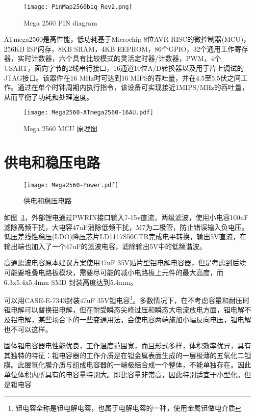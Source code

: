 \begin{figure}[htbp]
    \centering
    \texttt{[image: PinMap2560big\_Rev2.png]}
    \caption{Mega 2560 PIN diagram}
    \label{fig:PinMap2560}
\end{figure}

ATmega2560是高性能，低功耗基于Microchip 8位AVR RISC的微控制器(MCU)，256KB ISP闪存，8KB SRAM，4KB EEPROM，86个GPIO，32个通用工作寄存器，实时计数器，六个具有比较模式的灵活定时器/计数器，PWM，4个USART，面向字节的2线串行接口，16通道10位A/D转换器以及用于片上调试的JTAG接口。该器件在16 MHz时可达到16 MIPS的吞吐量，并在4.5至5.5伏之间工作。通过在单个时钟周期内执行指令，该设备可实现接近1MIPS/MHz的吞吐量，从而平衡了功耗和处理速度。

\begin{figure}[htbp]
    \centering
    \texttt{[image: Mega2560-ATmega2560-16AU.pdf]}
    \caption{Mega 2560 MCU 原理图}
    \label{fig:Mega2560-ATmega2560-16AU}
\end{figure}

\section{供电和稳压电路}

\begin{figure}[htbp]
    \centering
    \texttt{[image: Mega2560-Power.pdf]}
    \caption{供电和稳压电路}
    \label{fig:Mega2560-Power}
\end{figure}

如图~\ref{fig:Mega2560-Power}，外部锂电通过PWRIN接口输入7-15v直流，两级滤波，使用小电容100nF滤除高频干扰，大电容47uF消除低频干扰，M7为二极管，防止错误输入负电压。低压差线性稳压(LDO)降压芯片LD1117S50CTR完成电平转换，输出5V直流，在输出端也加入了一个47uF的滤波电容，滤除输出5V中的低频谐波。

高通滤波电容原本建议方案使用47uF 35V贴片型铝电解电容器，但是考虑到后续可能要堆叠电路板模块，需要尽可能的减小电路板上元件的最大高度，而6.3x5.4x5.4mm SMD 封装高度达到5.4mm。

可以用CASE-E-7343封装47uF 35V钽电容\footnote{钽电容全称是钽电解电容，也属于电解电容的一种，使用金属钽做电介质}。多数情况下，在不考虑容量和耐压时钽电解可以替换铝电解，但在耐受瞬态尖峰过压和瞬态大电流放电方面，钽电解不及铝电解，某些场合下的一些变通用法，会使电容两端施加小幅反向电压，钽电解也不可以这样。

固体钽电容器电性能优良，工作温度范围宽，而且形式多样，体积效率优异，具有其独特的特征：钽电容器的工作介质是在钽金属表面生成的一层极薄的五氧化二钽膜。此层氧化膜介质与组成电容器的一端极结合成一个整体，不能单独存在。因此单位体积内所具有的电容量特别大。即比容量非常高，因此特别适宜于小型化。但是钽电容


